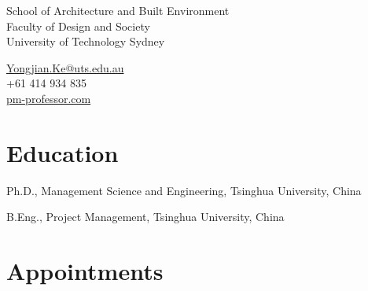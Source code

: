 \documentclass[11pt,a4paper]{report} %
\newcommand{\myname}{Yongjian Ke}
\newcommand{\namefont}[1]{{\normalfont\bfseries\Huge\color{accent}{#1}}}
\begin{document}
    \raggedright{}



    \namefont{\myname}

    \vspace{1em}
    \begin{minipage}[t]{0.700\textwidth}
        School of Architecture and Built Environment \\
        Faculty of Design and Society \\
        University of Technology Sydney
    \end{minipage}
    \begin{minipage}[t]{0.295\textwidth}
        \raggedleft{}
        \href{mailto:Yongjian.Ke@uts.edu.au}{Yongjian.Ke@uts.edu.au} \\
        +61 414 934 835 \\
        \href{https://pm-professor.com}{pm-professor.com}
    \end{minipage}



    \section*{Education}

    \begin{tablist}

        \item[2010] \tab{}Ph.D., Management Science and Engineering, Tsinghua University, China
        \item[2005] \tab{}B.Eng., Project Management, Tsinghua University, China

    \end{tablist}



    \section*{Appointments}
\end{document}
